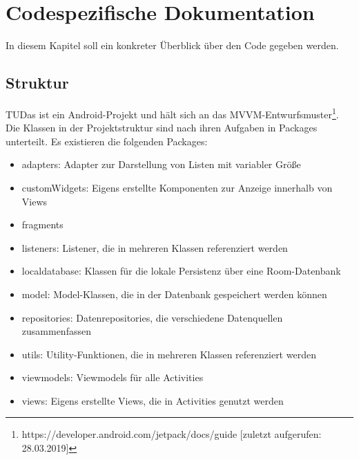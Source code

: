 \documentclass[noindent]{tudreport}
\begin{document}
	\chapter{Codespezifische Dokumentation}
		In diesem Kapitel soll ein konkreter Überblick über den Code gegeben werden.
		
		\section{Struktur}
			TUDas ist ein Android-Projekt und hält sich an das MVVM-Entwurfsmuster\footnote{https://developer.android.com/jetpack/docs/guide [zuletzt aufgerufen: 28.03.2019]}. Die Klassen in der Projektstruktur sind nach ihren Aufgaben in Packages unterteilt. Es existieren die folgenden Packages:
			\begin{itemize}
			\item adapters: Adapter zur Darstellung von Listen mit variabler Größe
			
			\item customWidgets: Eigens erstellte Komponenten zur Anzeige innerhalb von Views
			
			\item fragments
			
			\item listeners: Listener, die in mehreren Klassen referenziert werden
			
			\item localdatabase: Klassen für die lokale Persistenz über eine Room-Datenbank
			
			\item model: Model-Klassen, die in der Datenbank gespeichert werden können
			
			\item repositories: Datenrepositories, die verschiedene Datenquellen zusammenfassen
			
			\item utils: Utility-Funktionen, die in mehreren Klassen referenziert werden
			
			\item viewmodels: Viewmodels für alle Activities
			
			\item views: Eigens erstellte Views, die in Activities genutzt werden
			\end{itemize}
			
\end{document}
